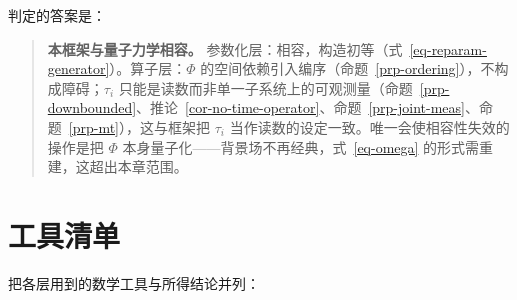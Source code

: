 \documentclass[
  chinese,
  a4paper,
  UTF8,
  12pt,
  oneside,
  openany]{ctexbook}
\theoremstyle{plain}
\theoremstyle{plain}
\theoremstyle{plain}
\theoremstyle{definition}
\theoremstyle{plain}
\theoremstyle{plain}
\theoremstyle{remark}
\begin{document}
判定的答案是：

\begin{quote}
\textbf{本框架与量子力学相容。}
参数化层：相容，构造初等（式~\ref{eq-reparam-generator}）。算子层：\(\Phi\)
的空间依赖引入编序（命题~\ref{prp-ordering}），不构成障碍；\(\tau_i\)
只能是读数而非单一子系统上的可观测量（命题~\ref{prp-downbounded}、推论~\ref{cor-no-time-operator}、命题~\ref{prp-joint-meas}、命题~\ref{prp-mt}），这与框架把
\(\tau_i\) 当作读数的设定一致。唯一会使相容性失效的操作是把 \(\Phi\)
本身量子化------背景场不再经典，式~\ref{eq-omega}
的形式需重建，这超出本章范围。
\end{quote}

\section{工具清单}\label{sec-cc-conclusion}

把各层用到的数学工具与所得结论并列：
\end{document}
